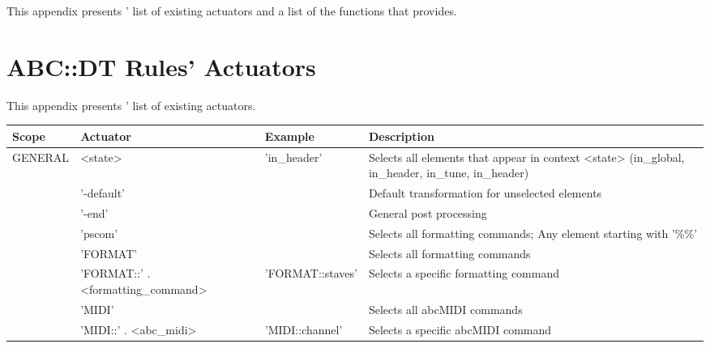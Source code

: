 This appendix presents \abcdtrules{}' list of existing actuators and a list of the functions that
\abcdt{} provides.

\section{ABC::DT Rules' Actuators}
\label{sec:abcdt_rules_actuators}

This appendix presents \abcdtrules{}' list of existing actuators.

\begin{center}
  \begin{tabular}{|p{2cm}|p{4.5cm}|p{3.5cm}|p{5cm}|}
    \hline
    Scope & Actuator & Example & Description \\
    \hline
    \hline
    \multirow{4}{*}{GENERAL}
    & <state>
    & 'in\_header'
    & Selects all \abc{} elements that appear in context <state> (in\_global, in\_header, in\_tune, in\_header)
    \\ \cline{2-4}
    \hline

    \hline
    \multirow{3}{*}{SPECIAL}
    & '-default'
    &
    & Default transformation for unselected \abc{} elements
    \\ \cline{2-4}

    & '-end'
    &
    & General post processing
    \\ \cline{2-4}
    \hline

    \hline
    \multirow{8}{*}{PSCOM}
    & 'pscom'
    &
    & Selects all formatting commands; Any element starting with '\%\%'
    \\ \cline{2-4}

    & 'FORMAT'
    &
    & Selects all formatting commands
    \\ \cline{2-4}

    & 'FORMAT::' . <formatting\_command>
    & 'FORMAT::staves'
    & Selects a specific formatting command
    \\ \cline{2-4}

    & 'MIDI'
    &
    & Selects all abcMIDI commands
    \\ \cline{2-4}

    & 'MIDI::' . <abc\_midi>
    & 'MIDI::channel'
    & Selects a specific abcMIDI command
    \\ \cline{2-4}
    \hline

  \end{tabular}
\end{center}

